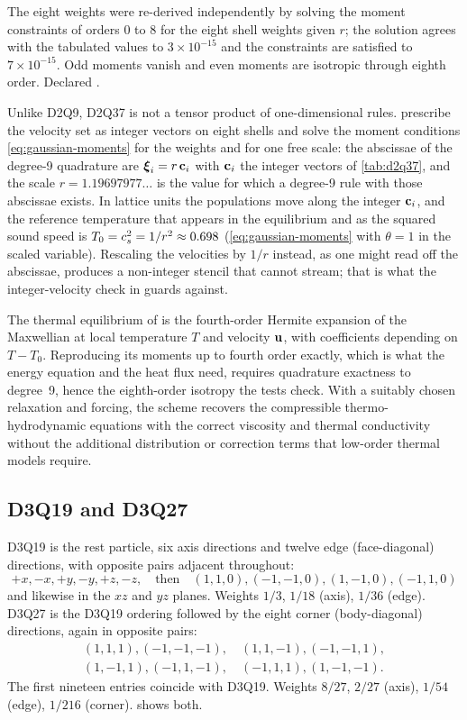 \begin{verified}
The eight weights were re-derived independently by solving the moment constraints of orders
0 to 8 for the eight shell weights given $r$; the solution agrees with the tabulated values to
$3\times10^{-15}$ and the constraints are satisfied to $7\times10^{-15}$. Odd moments vanish
and even moments are isotropic through eighth order. Declared .
\end{verified}

Unlike D2Q9, D2Q37 is not a tensor product of one-dimensional rules. \textcite{Philippi2006}
prescribe the velocity set as integer vectors on eight shells and solve the moment
conditions \cref{eq:gaussian-moments} for the weights and for one free scale: the abscissae
of the degree-9 quadrature are $\boldsymbol{\xi}_i = r\,\mathbf{c}_i$ with $\mathbf{c}_i$ the integer vectors
of \cref{tab:d2q37}, and the scale $r = 1.19697977\ldots$ is the value for which a
degree-9 rule with those abscissae exists. In lattice units the populations move along the
integer $\mathbf{c}_i$, and the reference temperature that appears in the equilibrium and as the
squared sound speed is $T_0 = c_s^2 = 1/r^2 \approx 0.698$ (\cref{eq:gaussian-moments} with
$\theta = 1$ in the scaled variable). Rescaling the velocities by $1/r$ instead, as one
might read off the abscissae, produces a non-integer stencil that cannot stream; that is what
the integer-velocity check in  guards against.

The thermal equilibrium of \textcite{Sbragaglia2009} is the fourth-order Hermite expansion
of the Maxwellian at local temperature $T$ and velocity $\mathbf{u}$, with coefficients depending on
$T - T_0$. Reproducing its moments up to fourth order exactly, which is what the energy
equation and the heat flux need, requires quadrature exactness to degree~9, hence the
eighth-order isotropy the tests check. With a suitably chosen relaxation and forcing, the
scheme recovers the compressible thermo-hydrodynamic equations with the correct viscosity
and thermal conductivity without the additional distribution or correction terms that
low-order thermal models require.

\subsection{D3Q19 and D3Q27}

D3Q19 is the rest particle, six axis directions and twelve edge (face-diagonal) directions,
with opposite pairs adjacent throughout:
\[
+x,-x,+y,-y,+z,-z,\quad\text{then}\quad (1,1,0),(-1,-1,0),(1,-1,0),(-1,1,0)
\]
and likewise in the $xz$ and $yz$ planes. Weights $1/3$, $1/18$ (axis), $1/36$ (edge).
D3Q27 is the D3Q19 ordering followed by the eight corner (body-diagonal) directions, again
in opposite pairs:
\begin{gather*}
(1,1,1),(-1,-1,-1),\quad (1,1,-1),(-1,-1,1),\\
(1,-1,1),(-1,1,-1),\quad (-1,1,1),(1,-1,-1).
\end{gather*}
The first nineteen entries coincide with D3Q19. Weights $8/27$, $2/27$ (axis), $1/54$
(edge), $1/216$ (corner).  shows both.

